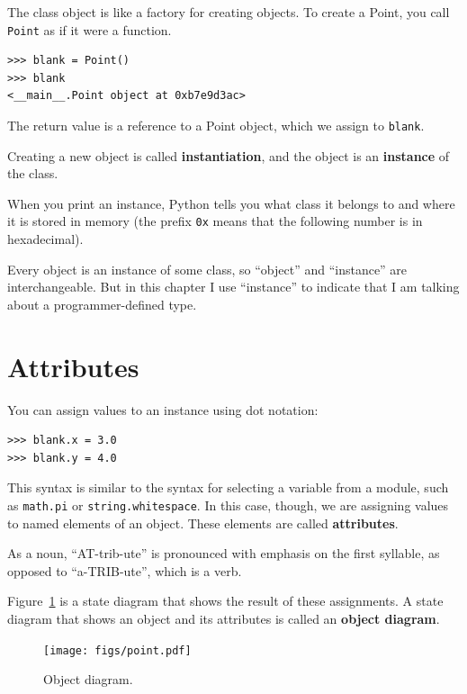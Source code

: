 \documentclass[10pt]{book}
\begin{document}
The class object is like a factory for creating objects.  To create a
Point, you call {\tt Point} as if it were a function.

\begin{verbatim}
>>> blank = Point()
>>> blank
<__main__.Point object at 0xb7e9d3ac>
\end{verbatim}
%
The return value is a reference to a Point object, which we
assign to {\tt blank}.

Creating a new object is called
{\bf instantiation}, and the object is an {\bf instance} of
the class.

When you print an instance, Python tells you what class it
belongs to and where it is stored in memory (the prefix
{\tt 0x} means that the following number is in hexadecimal).

Every object is an instance of some class, so ``object'' and
``instance'' are interchangeable.  But in this chapter I use
``instance'' to indicate that I am talking about a programmer-defined
type.


\section{Attributes}
\label{attributes}

You can assign values to an instance using dot notation:

\begin{verbatim}
>>> blank.x = 3.0
>>> blank.y = 4.0
\end{verbatim}
%
This syntax is similar to the syntax for selecting a variable from a
module, such as {\tt math.pi} or {\tt string.whitespace}.  In this case,
though, we are assigning values to named elements of an object.
These elements are called {\bf attributes}.

As a noun, ``AT-trib-ute'' is pronounced with emphasis on the first
syllable, as opposed to ``a-TRIB-ute'', which is a verb.

Figure~\ref{fig.point} is a state diagram that shows the result of these assignments.
A state diagram that shows an object and its attributes is
called an {\bf object diagram}.

\begin{figure}
\centerline
{\texttt{[image: figs/point.pdf]}}
\caption{Object diagram.}
\label{fig.point}
\end{figure}
\end{document}
